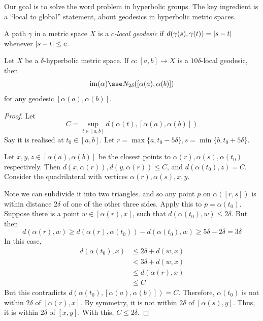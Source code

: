 \documentclass{article}
\begin{document}
Our goal is to solve the word problem in hyperbolic groups. The key ingredient is a ``local to global'' statement, about geodesics in hyperbolic metric spaces.

\begin{definition}
    A path \(\gamma\) in a metric space \(X\) is a \emph{\(c\)-local geodesic} if \(d(\gamma(s), \gamma(t)) = \abs{s - t}\) whenever \(\abs{s - t} \le c\).
\end{definition}

\begin{lemma}
    Let \(X\) be a \(\delta\)-hyperbolic metric space. If \(\alpha : [a, b] \to X\) is a \(10\delta\)-local geodesic, then
    \[\im(\alpha) \sse N_{2\delta}([\alpha(a), \alpha(b)])\]
    for any geodesic \([\alpha(a), \alpha(b)]\).
\end{lemma}

\begin{proof}
    Let
    \[C = \sup_{t \in [a, b]}d(\alpha(t), [\alpha(a), \alpha(b)])\]
    Say it is realised at \(t_0 \in [a, b]\). Let \(r = \max\{a, t_0 - 5\delta\}, s = \min\{b, t_0 + 5\delta\}\).

    Let \(x, y, z \in [\alpha(a), \alpha(b)]\) be the closest points to \(\alpha(r), \alpha(s), \alpha(t_0)\) respectively. Then \(d(x, \alpha(r)), d(y, \alpha(r)) \le C\), and \(d(\alpha(t_0), z) = C\). Consider the quadrilateral with vertices \(\alpha(r), \alpha(s), x, y\).

    Note we can subdivide it into two triangles. and so any point \(p\) on \(\alpha([r, s])\) is within distance \(2\delta\) of one of the other three sides. Apply this to \(p = \alpha(t_0)\). Suppose there is a point \(w \in [\alpha(r), x]\), such that \(d(\alpha(t_0), w) \le 2\delta\). But then
    \[d(\alpha(r), w) \ge d(\alpha(r), \alpha(t_0)) - d(\alpha(t_0), w) \ge 5\delta - 2\delta = 3\delta\]
    In this case,
    \begin{align*}
        d(\alpha(t_0), x) &\le 2\delta + d(w, x) \\
        &< 3\delta + d(w, x) \\
        &\le d(\alpha(r), x) \\
        &\le C
    \end{align*}
    But this contradicts \(d(\alpha(t_0), [\alpha(a), \alpha(b)]) = C\). Therefore, \(\alpha(t_0)\) is not within \(2\delta\) of \([\alpha(r), x]\). By symmetry, it is not within \(2\delta\) of \([\alpha(s), y]\). Thus, it is within \(2\delta\) of \([x, y]\). With this, \(C \le 2\delta\).
\end{proof}
\end{document}
